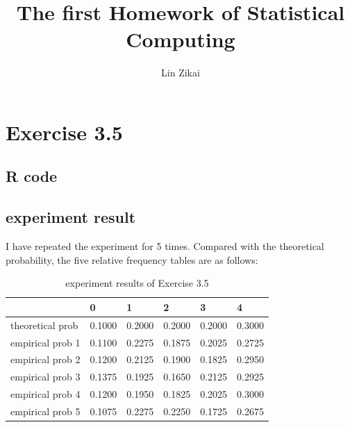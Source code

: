 \documentclass{article}
\title{The first Homework of Statistical Computing}
\author{Lin Zikai}
\begin{document}
	\maketitle
    \tableofcontents

\section{Exercise 3.5}
    \subsection{R code}
        
    \subsection{experiment result}
        I have repeated the experiment for 5 times. Compared with the theoretical probability,
        the five relative frequency tables are as follows:
        
        \begin{table}[H]
            \centering
            \caption{experiment results of Exercise 3.5}
            \begin{tabular}{llllll}
            \hline
                             & 0      & 1      & 2      & 3      & 4      \\ \hline
            theoretical prob & 0.1000 & 0.2000 & 0.2000 & 0.2000 & 0.3000 \\
            empirical prob 1 & 0.1100 & 0.2275 & 0.1875 & 0.2025 & 0.2725 \\
            empirical prob 2 & 0.1200 & 0.2125 & 0.1900 & 0.1825 & 0.2950 \\
            empirical prob 3 & 0.1375 & 0.1925 & 0.1650 & 0.2125 & 0.2925 \\
            empirical prob 4 & 0.1200 & 0.1950 & 0.1825 & 0.2025 & 0.3000 \\
            empirical prob 5 & 0.1075 & 0.2275 & 0.2250 & 0.1725 & 0.2675 \\ \hline
            \end{tabular}
            \end{table}
\end{document}
